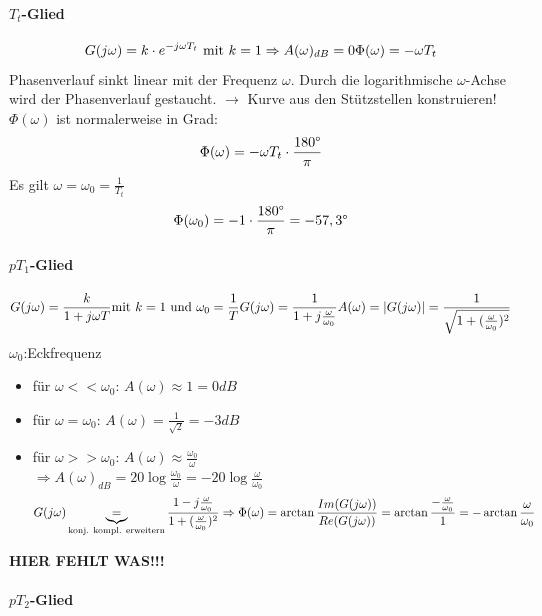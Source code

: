 \message{ !name(Mitschrieb_SysRegel.tex)}\documentclass[12pt,a4paper,ngerman]{scrartcl}
\begin{document}
\paragraph{$T_t$-Glied}

\[
G(j\omega)=k\cdot e^{-j\omega T_t} \text{ mit }k=1\\
\Rightarrow A(\omega)_{dB}=0\\
\Phi(\omega)=-\omega T_t
\]
Phasenverlauf sinkt linear mit der Frequenz $\omega$. Durch die logarithmische $\omega$-Achse wird der Phasenverlauf gestaucht. $\rightarrow$ Kurve aus den Stützstellen konstruieren! \\
$\Phi(\omega)$ ist normalerweise in Grad:
\[
\Phi(\omega)=-\omega T_t\cdot \frac{180\degree}{\pi}
\]
Es gilt $\omega = \omega_0 =\frac{1}{T_t}$
\[
\Phi(\omega_0)=-1\cdot \frac{180\degree}{\pi}=-57,3\degree
\]

\paragraph{$pT_1$-Glied}

\[
G(j\omega)=\frac{k}{1+j\omega T}\\
\text{mit } k=1 \text{ und } \omega_0=\frac{1}{T}\\
G(j\omega)=\frac{1}{1+j\frac{\omega}{\omega_0}}\\
A(\omega)=|G(j\omega)|=\frac{1}{\sqrt{1+(\frac{\omega}{\omega_0})^2}}
\]
$\omega_0$:Eckfrequenz
\begin{itemize}
\item für $\omega << \omega_0$: $A(\omega)\approx 1 =0dB$
\item für $\omega=\omega_0$: $A(\omega)=\frac{1}{\sqrt{2}}= -3dB$
\item für $\omega >>\omega_0$: $A(\omega)\approx \frac{\omega_0}{\omega}$\\
  $\Rightarrow A(\omega)_{dB}=20\log{\frac{\omega_0}{\omega}}=-20\log{\frac{\omega}{\omega_0}}$
\[
G(j\omega)\underbrace{=}_{\text{konj. kompl. erweitern}} \frac{1-j\frac{\omega}{\omega_0}}{1+(\frac{\omega}{\omega_0})^2}\\
\Rightarrow \Phi(\omega)=\arctan{\frac{Im(G(j\omega))}{Re(G(j\omega))}}\\
 =\arctan{\frac{-\frac{\omega}{\omega_0}}{1}}=-\arctan{\frac{\omega}{\omega_0}}
\]
\end{itemize}
\textbf{HIER FEHLT WAS!!!}

\paragraph{$pT_2$-Glied}
\end{document}
